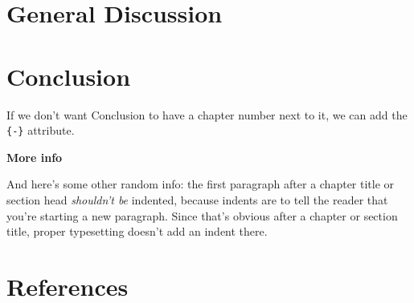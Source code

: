 \documentclass[twoside,10pt]{gihclass} %
\begin{document}
\hypertarget{general-discussion}{%
\chapter{General Discussion}\label{general-discussion}}

\hypertarget{conclusion}{%
\chapter*{Conclusion}\label{conclusion}}

If we don't want Conclusion to have a chapter number next to it, we can add the \texttt{\{-\}} attribute.

\textbf{More info}

And here's some other random info: the first paragraph after a chapter title or section head \emph{shouldn't be} indented, because indents are to tell the reader that you're starting a new paragraph. Since that's obvious after a chapter or section title, proper typesetting doesn't add an indent there.

\backmatter

\hypertarget{references}{%
\chapter*{References}\label{references}}


\noindent

\setlength{\parindent}{-0.20in}
\setlength{\leftskip}{0.20in}
\setlength{\parskip}{8pt}
\end{document}
